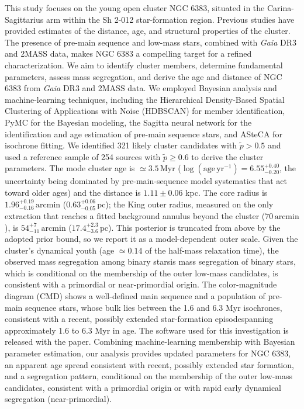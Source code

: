 \documentclass{aa}
\providecommand{\DIFaddtex}[1]{{\protect\color[rgb]{0,0,0.7}#1}} %
\providecommand{\DIFdeltex}[1]{{\protect\color[rgb]{0.65,0,0}\footnotesize #1}} %
\providecommand{\DIFaddbegin}{} %
\providecommand{\DIFaddend}{} %
\providecommand{\DIFdelbegin}{} %
\providecommand{\DIFdelend}{} %
\providecommand{\DIFadd}[1]{\texorpdfstring{\DIFaddtex{#1}}{#1}} %
\providecommand{\DIFdel}[1]{\texorpdfstring{\DIFdeltex{#1}}{}} %
\providecommand{\DIFscaledelfig}{0.5}
\newlength{\DIFdelgraphicswidth} %
\newlength{\DIFdelgraphicsheight} %
\providecommand{\DIFaddincludegraphics}[2][]{{\color{blue}\fbox{\DIFOincludegraphics[#1]{#2}}}} %
\providecommand{\DIFdelincludegraphics}[2][]{%
\sbox{\DIFdelgraphicsbox}{\DIFOincludegraphics[#1]{#2}}%
\settoboxwidth{\DIFdelgraphicswidth}{\DIFdelgraphicsbox} %
\settoboxtotalheight{\DIFdelgraphicsheight}{\DIFdelgraphicsbox} %
\scalebox{\DIFscaledelfig}{%
\parbox[b]{\DIFdelgraphicswidth}{\usebox{\DIFdelgraphicsbox}\\[-\baselineskip] \rule{\DIFdelgraphicswidth}{0em}}\llap{\resizebox{\DIFdelgraphicswidth}{\DIFdelgraphicsheight}{%
\setlength{\unitlength}{\DIFdelgraphicswidth}%
\begin{picture}(1,1)%
\thicklines\linethickness{2pt} %
{\color[rgb]{1,0,0}\put(0,0){\framebox(1,1){}}}%
{\color[rgb]{1,0,0}\put(0,0){\line( 1,1){1}}}%
{\color[rgb]{1,0,0}\put(0,1){\line(1,-1){1}}}%
\end{picture}%
}\hspace*{3pt}}} %
} %
\DeclareRobustCommand{\DIFaddbegin}{\DIFOaddbegin \let\includegraphics\DIFaddincludegraphics} %
\DeclareRobustCommand{\DIFaddend}{\DIFOaddend \let\includegraphics\DIFOincludegraphics} %
\DeclareRobustCommand{\DIFdelbegin}{\DIFOdelbegin \let\includegraphics\DIFdelincludegraphics} %
\DeclareRobustCommand{\DIFdelend}{\DIFOaddend \let\includegraphics\DIFOincludegraphics} %
\begin{document}
  \abstract
   {This study focuses on the young open cluster NGC 6383, situated in the Carina-Sagittarius arm within the Sh 2-012 star-formation region. Previous studies have provided estimates of the distance, age, and structural properties of the cluster. The presence of pre-main sequence and low-mass stars, combined with \textit{Gaia} DR3 and 2MASS data, makes NGC 6383 a compelling target for a refined characterization.}
   {We aim to identify cluster members, determine fundamental parameters, assess mass segregation, and derive the age and distance of NGC 6383 from \textit{Gaia} DR3 and 2MASS data.}
   {We employed Bayesian analysis and machine-learning techniques, including the Hierarchical Density-Based Spatial Clustering of Applications with Noise (HDBSCAN) for member identification, PyMC for the Bayesian modeling, the Sagitta neural network for the identification and age estimation of pre-main sequence stars, and ASteCA for isochrone fitting.}   
   {We identified 321 likely cluster candidates with $\tilde{p}>0.5$ and used a reference sample of 254 sources with $\tilde{p}\geq0.6$ to derive the cluster parameters. The mode cluster age is $\simeq3.5\,\mathrm{Myr}$ ($\log(\mathrm{age}\,\mathrm{yr^{-1}}) = 6.55^{+0.40}_{-0.20}$, the uncertainty being dominated by pre-main-sequence model systematics that act toward older ages) and the distance is $1.11\pm 0.06$ kpc. The core radius is $1.96^{+0.19}_{-0.16}\,\mathrm{arcmin}$ ($0.63^{+0.06}_{-0.05}\,\mathrm{pc}$); the King outer radius, measured on the only extraction that reaches a fitted background annulus beyond the cluster ($70\,\mathrm{arcmin}$), is $54^{+7}_{-11}\,\mathrm{arcmin}$ ($17.4^{+2.3}_{-3.6}\,\mathrm{pc}$). This posterior is truncated from above by the adopted prior bound, so we report it as a model-dependent outer scale. Given the cluster's dynamical youth (age $\simeq0.14$ of the half-mass relaxation time), the \DIFdelbegin \DIFdel{observed mass segregation among binary starsis }\DIFdelend \DIFaddbegin \DIFadd{mass segregation of binary stars, which is conditional on the membership of the outer low-mass candidates, is }\DIFaddend consistent with a primordial or near-primordial origin. The color-magnitude diagram (CMD) shows a well-defined main sequence and a population of pre-main sequence stars, \DIFaddbegin \DIFadd{whose bulk lies between the 1.6 and 6.3 Myr isochrones, }\DIFaddend consistent with a recent, possibly extended star-formation episode\DIFdelbegin \DIFdel{spanning approximately 1.6 to 6.3 Myr in age}\DIFdelend . The software used for this investigation is released with the paper.}
   {Combining machine-learning membership with Bayesian parameter estimation, our analysis provides updated parameters for NGC 6383, an apparent age spread consistent with recent, possibly extended star formation, and a segregation pattern\DIFaddbegin \DIFadd{, conditional on the membership of the outer low-mass candidates, }\DIFaddend consistent with a primordial origin or with rapid early dynamical segregation (near-primordial).}
\end{document}
